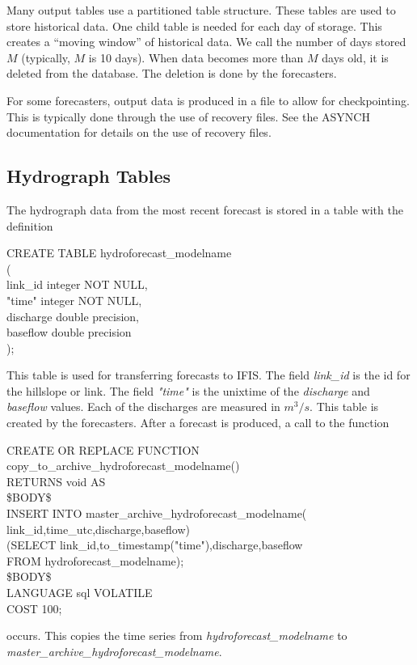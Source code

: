 \documentclass[12pt]{article}
\newenvironment{codeindent}
{\begin{list}{}
        {\setlength{\leftmargin}{.1in}}
        \item[]
}
{\end{list}}
\begin{document}
Many output tables use a partitioned table structure. These tables are used to store historical data. One child table is needed for each day of storage. This creates a ``moving window'' of historical data. We call the number of days stored $M$ (typically, $M$ is 10 days). When data becomes more than $M$ days old, it is deleted from the database. The deletion is done by the forecasters.

For some forecasters, output data is produced in a file to allow for checkpointing. This is typically done through the use of recovery files. See the ASYNCH documentation for details on the use of recovery files.

\subsection{Hydrograph Tables} \label{sec: hydrograph tables}

The hydrograph data from the most recent forecast is stored in a table with the definition
\begin{codeindent}
CREATE TABLE hydroforecast\_modelname \\
( \\
  link\_id integer NOT NULL, \\
  "time" integer NOT NULL, \\
  discharge double precision, \\
  baseflow double precision \\
);
\end{codeindent}
This table is used for transferring forecasts to IFIS. The field \emph{link\_id} is the id for the hillslope or link. The field \emph{"time"} is the unixtime of the \emph{discharge} and \emph{baseflow} values. Each of the discharges are measured in $m^3/s$. This table is created by the forecasters. After a forecast is produced, a call to the function
\begin{codeindent}
CREATE OR REPLACE FUNCTION \\
  copy\_to\_archive\_hydroforecast\_modelname() \\
 RETURNS void AS \\
\$BODY\$ \\
INSERT INTO master\_archive\_hydroforecast\_modelname( \\
	link\_id,time\_utc,discharge,baseflow) \\
	(SELECT link\_id,to\_timestamp("time"),discharge,baseflow \\
	FROM hydroforecast\_modelname); \\
\$BODY\$ \\
  LANGUAGE sql VOLATILE \\
  COST 100;
\end{codeindent}
occurs. This copies the time series from \emph{hydroforecast\_modelname} to \emph{master\_archive\_hydroforecast\_modelname}.
\end{document}
